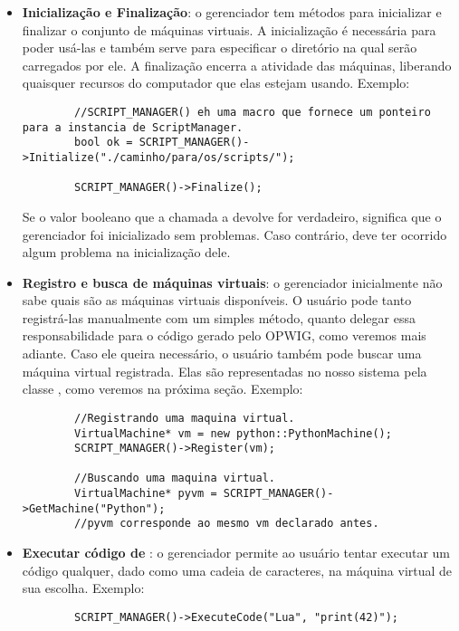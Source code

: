   \begin{itemize}

    \item \textbf{Inicialização e Finalização}: o gerenciador tem métodos para inicializar e finalizar o conjunto
      de máquinas virtuais. A inicialização é necessária para poder usá-las e também serve para
      especificar o diretório na qual  serão carregados por ele. A finalização 
      encerra a atividade das máquinas, liberando quaisquer recursos do computador que elas
      estejam usando. Exemplo:
      \vspace{0.01em}
      \begin{lstlisting}
        //SCRIPT_MANAGER() eh uma macro que fornece um ponteiro para a instancia de ScriptManager.
        bool ok = SCRIPT_MANAGER()->Initialize("./caminho/para/os/scripts/");
        
        SCRIPT_MANAGER()->Finalize();
      \end{lstlisting}
      \vspace{0.5em}
      Se o valor booleano que a chamada a  devolve for verdadeiro, significa que o gerenciador
      foi inicializado sem problemas. Caso contrário, deve ter ocorrido algum problema na inicialização dele.

    \item \textbf{Registro e busca de máquinas virtuais}: o gerenciador inicialmente não sabe
      quais são as máquinas virtuais disponíveis. O usuário pode tanto registrá-las manualmente com
      um simples método, quanto delegar essa responsabilidade para o código gerado pelo OPWIG, como
      veremos mais adiante. Caso ele queira necessário, o usuário também pode buscar uma máquina
      virtual registrada. Elas são representadas no nosso sistema pela classe \VMac{},
      como veremos na próxima seção. Exemplo:
      \vspace{1em}
      \begin{lstlisting}
        //Registrando uma maquina virtual.
        VirtualMachine* vm = new python::PythonMachine();
        SCRIPT_MANAGER()->Register(vm);
        
        //Buscando uma maquina virtual.
        VirtualMachine* pyvm = SCRIPT_MANAGER()->GetMachine("Python");
        //pyvm corresponde ao mesmo vm declarado antes.
      \end{lstlisting}

    \item \textbf{Executar código de \script{}}: o gerenciador permite ao usuário tentar executar um código
      qualquer, dado como uma cadeia de caracteres, na máquina virtual de sua escolha. Exemplo:
      \vspace{1em}
      \begin{lstlisting}
        SCRIPT_MANAGER()->ExecuteCode("Lua", "print(42)");
      \end{lstlisting}


\end{itemize}
